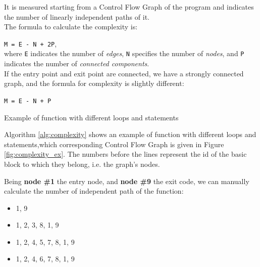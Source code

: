 It is measured starting from a Control Flow Graph of the program and indicates the number of linearly independent paths of it. 
\\
The formula to calculate the complexity is:

\texttt{M =  E - N + 2P},\\
where \texttt{E} indicates the number of \textit{edges}, \texttt{N} specifies the number of \textit{nodes}, and \texttt{P} indicates the number of \textit{connected components}.\\

If the entry point and exit point are connected, we have a strongly connected graph, and the formula for complexity is slightly different: 

\texttt{M = E - N + P}

\begin{algorithm}
	\caption{Example of function with different loops and statements}\label{alg:complexity}
	\begin{algorithmic}[1]
		
		\setcounter{ALG@line}{0}
		\setcounter{ALG@line}{1}
		\setcounter{ALG@line}{2}
		\Else{ }
		\setcounter{ALG@line}{3}
		\setcounter{ALG@line}{4}
		\Else{}
		\setcounter{ALG@line}{5}
		
		\EndIf
		
		\EndIf
		\setcounter{ALG@line}{7}
		
		
		
		\EndWhile
		
		
		
		\setcounter{ALG@line}{0}
		
		
	\end{algorithmic}
\end{algorithm}

Algorithm \ref{alg:complexity} shows an example of function with different loops and statements,which corresponding Control Flow Graph is given in Figure \ref{fig:complexity_ex}. The numbers before the lines represent the id of the basic block to which they belong, i.e. the graph's nodes.

Being \textbf{node \#1} the entry node, and \textbf{node \#9} the exit code, we can manually calculate the number of independent path of the function:
\begin{itemize}
	\item 1, 9
	\item 1, 2, 3, 8, 1, 9
	\item 1, 2, 4, 5, 7, 8, 1, 9
	\item 1, 2, 4, 6, 7, 8, 1, 9
\end{itemize}

